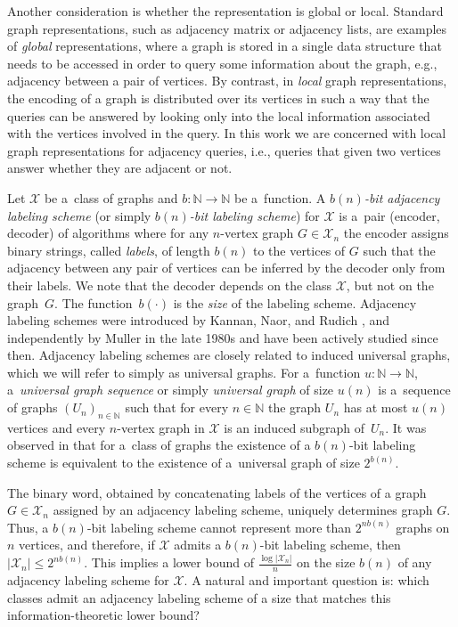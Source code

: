 \documentclass[letterpaper,11pt]{article}
\newcommand{\Nn}{\mathbb{N}}
\newcommand{\Xc}{\mathcal{X}}
\theoremstyle{definition}
\theoremstyle{remark}
\renewcommand{\leq}{\leqslant}
\begin{document}
	Another consideration is whether the representation is global or local. Standard graph representations, such as adjacency matrix or adjacency lists, are examples of \emph{global} representations, where a graph is stored in a single data structure that needs to be accessed in order to query some information about the graph, e.g., adjacency between a pair of vertices. By contrast, in \emph{local} graph representations, the  encoding of a graph is distributed over its vertices in such a way that the queries can be answered by looking only into the local information associated with the vertices involved in the query. In this work we are concerned with local graph representations for adjacency queries, i.e., queries that given two vertices answer whether they are adjacent or not.
	
	Let $\Xc$ be a~class of graphs and $b : \Nn \rightarrow \Nn$ be a~function. A \emph{$b(n)$-bit adjacency labeling scheme} (or simply \emph{$b(n)$-bit labeling scheme})  for $\Xc$ is a~pair (encoder, decoder) of algorithms where for any $n$-vertex graph $G\in \Xc_n$ the encoder assigns binary strings, called \emph{labels}, of length $b(n)$ to the vertices of $G$ such that the adjacency between any pair of vertices can be inferred by the decoder only from their labels.
	We note that the decoder depends on the class $\Xc$, but not on the graph~$G$.
	The function~$b(\cdot)$ is the \emph{size} of the labeling scheme.
	Adjacency labeling schemes were introduced by Kannan, Naor, and Rudich \cite{KNR88,KNR92},
	and independently by Muller \cite{Muller88} in the late 1980s and have been actively studied since then.
	Adjacency labeling schemes are closely related to induced universal graphs, which we will refer to simply as universal graphs.
	For a~function $u : \Nn \rightarrow \Nn$, a~\emph{universal graph sequence} or simply \emph{universal graph} of size $u(n)$ is a~sequence
	of graphs $(U_n)_{n\in \Nn}$ such that for every $n \in \Nn$ the graph $U_n$ has at most $u(n)$ vertices and every $n$-vertex graph in $\Xc$ is an induced subgraph of~$U_n$.
	It was observed in \cite{KNR92} that for a~class of graphs the existence of a $b(n)$-bit labeling scheme is equivalent to the existence of a~universal graph of size $2^{b(n)}$.
	
	The binary word, obtained by concatenating labels of the vertices of a graph $G \in \Xc_n$ assigned by an adjacency labeling scheme, uniquely determines graph $G$.
	Thus, a $b(n)$-bit labeling scheme cannot represent more than $2^{n b(n)}$ graphs on $n$ vertices, and therefore, if $\Xc$ admits a $b(n)$-bit labeling scheme, then $|\Xc_n| \leq 2^{n b(n)}$.
	This implies a lower bound of $\frac{\log |\Xc_n|}{n}$ on the size $b(n)$ of any adjacency labeling scheme for $\Xc$.
	A natural and important question is: which classes admit an adjacency labeling scheme of a size that matches this information-theoretic lower bound?
	
\end{document}
